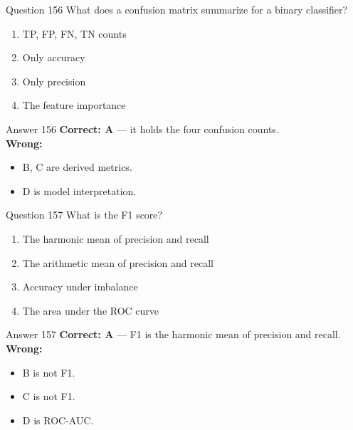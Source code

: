 \documentclass[aspectratio=169,11pt]{beamer}
\begin{document}
	\begin{frame}{Question 156}
		What does a confusion matrix summarize for a binary classifier?
		\begin{enumerate}[label=\Alph*.]
			\item TP, FP, FN, TN counts
			\item Only accuracy
			\item Only precision
			\item The feature importance
		\end{enumerate}
	\end{frame}
	\begin{frame}{Answer 156}
		\textbf{Correct: A} --- it holds the four confusion counts.\\
		\vspace{0.5em}
		\textbf{Wrong:}
		\begin{itemize}
			\item B, C are derived metrics.
			\item D is model interpretation.
		\end{itemize}
	\end{frame}
	
	\begin{frame}{Question 157}
		What is the F1 score?
		\begin{enumerate}[label=\Alph*.]
			\item The harmonic mean of precision and recall
			\item The arithmetic mean of precision and recall
			\item Accuracy under imbalance
			\item The area under the ROC curve
		\end{enumerate}
	\end{frame}
	\begin{frame}{Answer 157}
		\textbf{Correct: A} --- F1 is the harmonic mean of precision and recall.\\
		\vspace{0.5em}
		\textbf{Wrong:}
		\begin{itemize}
			\item B is not F1.
			\item C is not F1.
			\item D is ROC-AUC.
		\end{itemize}
	\end{frame}
	
\end{document}
